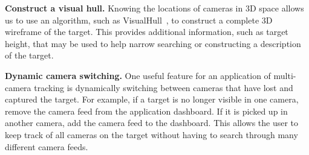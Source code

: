 \documentclass{article}
\begin{document}
\vspace{5pt}
\noindent\textbf{Construct a visual hull.} Knowing the locations of cameras in 3D space allows us to use an algorithm, such as VisualHull~\cite{laurentini1994visual}, to construct a complete 3D wireframe of the target. This provides additional information, such as target height, that may be used to help narrow searching or constructing a description of the target.

\vspace{5pt}
\noindent\textbf{Dynamic camera switching.} One useful feature for an application of multi-camera tracking is dynamically switching between cameras that have lost and captured the target. For example, if a target is no longer visible in one camera, remove the camera feed from the application dashboard. If it is picked up in another camera, add the camera feed to the dashboard. This allows the user to keep track of all cameras on the target without having to search through many different camera feeds.



\end{document}
